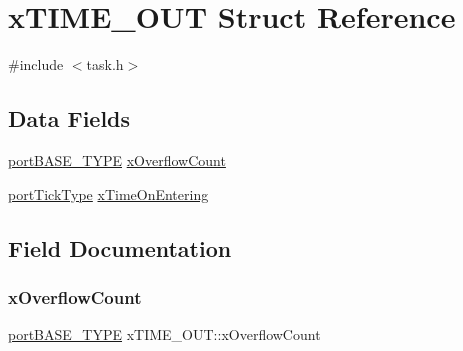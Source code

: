 \hypertarget{structx_t_i_m_e___o_u_t}{}\section{x\+T\+I\+M\+E\+\_\+\+O\+UT Struct Reference}
\label{structx_t_i_m_e___o_u_t}


{\ttfamily \#include $<$task.\+h$>$}

\subsection*{Data Fields}
\begin{DoxyCompactItemize}
\item 
\mbox{\hyperlink{portmacro_8h_a1ebe82d24d764ae4e352f7c3a9f92c01}{port\+B\+A\+S\+E\+\_\+\+T\+Y\+PE}} \mbox{\hyperlink{structx_t_i_m_e___o_u_t_ac04daff481f3ee5f08228b09a83a678b}{x\+Overflow\+Count}}
\item 
\mbox{\hyperlink{portmacro_8h_a4d746b2ff8fafc490b764c66411ec457}{port\+Tick\+Type}} \mbox{\hyperlink{structx_t_i_m_e___o_u_t_a8342bf2057b33c50205da6a19d9caa1c}{x\+Time\+On\+Entering}}
\end{DoxyCompactItemize}


\subsection{Field Documentation}
\mbox{\label{structx_t_i_m_e___o_u_t_ac04daff481f3ee5f08228b09a83a678b}} 
\subsubsection{\texorpdfstring{x\+Overflow\+Count}{xOverflowCount}}
{\footnotesize\ttfamily \mbox{\hyperlink{portmacro_8h_a1ebe82d24d764ae4e352f7c3a9f92c01}{port\+B\+A\+S\+E\+\_\+\+T\+Y\+PE}} x\+T\+I\+M\+E\+\_\+\+O\+U\+T\+::x\+Overflow\+Count}

\mbox{\label{structx_t_i_m_e___o_u_t_a8342bf2057b33c50205da6a19d9caa1c}} 
